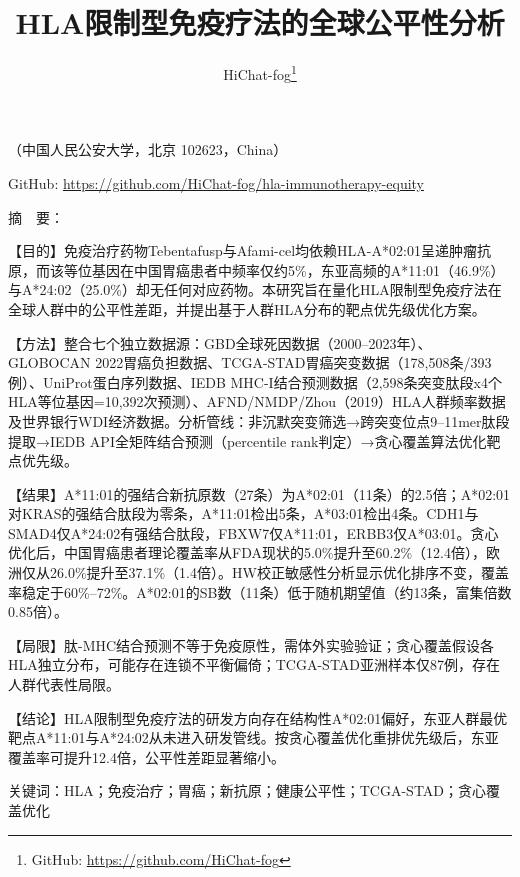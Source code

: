 \documentclass[12pt,a4paper]{ctexart}
\title{{\heiti\zihao{2} HLA限制型免疫疗法的全球公平性分析}}
\author{{\kaishu HiChat-fog}\footnote{{\kai GitHub: \url{https://github.com/HiChat-fog}}}}
\date{}
\begin{document}
\maketitle

\begin{center}
{\song{}（中国人民公安大学，北京 102623，China）}
\vspace{0.2cm}

{\song{} GitHub: \url{https://github.com/HiChat-fog/hla-immunotherapy-equity}}
\end{center}

\vspace{0.8cm}

{\heiti{} 摘\ \ 要：}

\vspace{0.3cm}

{\heiti 【目的】}免疫治疗药物Tebentafusp与Afami-cel均依赖HLA-A*02:01呈递肿瘤抗原，而该等位基因在中国胃癌患者中频率仅约5\%，东亚高频的A*11:01（46.9\%）与A*24:02（25.0\%）却无任何对应药物。本研究旨在量化HLA限制型免疫疗法在全球人群中的公平性差距，并提出基于人群HLA分布的靶点优先级优化方案。

{\heiti 【方法】}整合七个独立数据源：GBD全球死因数据（2000--2023年）、GLOBOCAN 2022胃癌负担数据、TCGA-STAD胃癌突变数据（178,508条/393例）、UniProt蛋白序列数据、IEDB MHC-I结合预测数据（2,598条突变肽段x4个HLA等位基因=10,392次预测）、AFND/NMDP/Zhou（2019）HLA人群频率数据及世界银行WDI经济数据。分析管线：非沉默突变筛选→跨突变位点9--11mer肽段提取→IEDB API全矩阵结合预测（percentile rank判定）→贪心覆盖算法优化靶点优先级。

{\heiti 【结果】}A*11:01的强结合新抗原数（27条）为A*02:01（11条）的2.5倍；A*02:01对KRAS的强结合肽段为零条，A*11:01检出5条，A*03:01检出4条。CDH1与SMAD4仅A*24:02有强结合肽段，FBXW7仅A*11:01，ERBB3仅A*03:01。贪心优化后，中国胃癌患者理论覆盖率从FDA现状的5.0\%提升至60.2\%（12.4倍），欧洲仅从26.0\%提升至37.1\%（1.4倍）。HW校正敏感性分析显示优化排序不变，覆盖率稳定于60\%--72\%。A*02:01的SB数（11条）低于随机期望值（约13条，富集倍数0.85倍）。

{\heiti 【局限】}肽-MHC结合预测不等于免疫原性，需体外实验验证；贪心覆盖假设各HLA独立分布，可能存在连锁不平衡偏倚；TCGA-STAD亚洲样本仅87例，存在人群代表性局限。

{\heiti 【结论】}HLA限制型免疫疗法的研发方向存在结构性A*02:01偏好，东亚人群最优靶点A*11:01与A*24:02从未进入研发管线。按贪心覆盖优化重排优先级后，东亚覆盖率可提升12.4倍，公平性差距显著缩小。

\vspace{0.5cm}
{\heiti 关键词：}HLA；免疫治疗；胃癌；新抗原；健康公平性；TCGA-STAD；贪心覆盖优化
\end{document}
